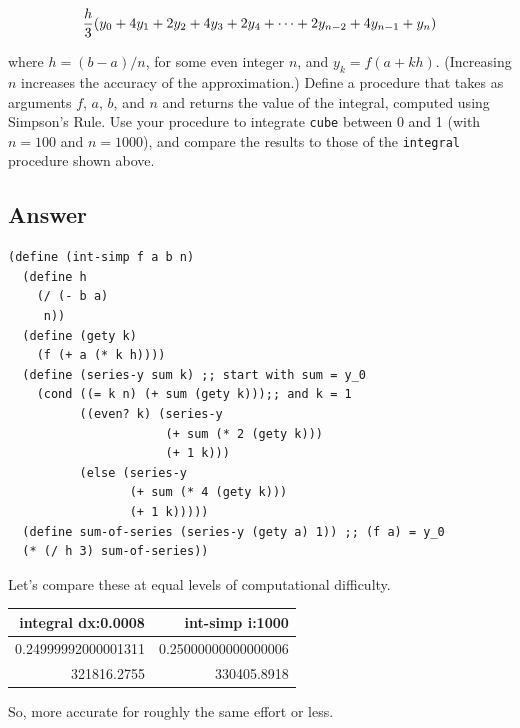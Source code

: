 \documentclass[final,fleqn,titlepage]{article}
\begin{document}
\[
{h\over 3}(y_0 + 4y_1 + 2y_2 + 4y_3 + 2y_4 + \dots + 2y_{n-2} + 4y_{n-1} + y_n)
\]

where \(h = (b - a) / n\), for some even integer \(n\), and \(y_k = f(a + kh)\).
(Increasing \(n\) increases the accuracy of the approximation.) Define a
procedure that takes as arguments \(f\), \(a\), \(b\), and \(n\) and returns the
value of the integral, computed using Simpson's Rule. Use your procedure to
integrate \texttt{cube} between 0 and 1 (with \(n = 100\) and \(n = 1000\)), and
compare the results to those of the \texttt{integral} procedure shown above.
\subsection{Answer}
\label{sec:orgf5c3def}
\begin{verbatim}
(define (int-simp f a b n)
  (define h
    (/ (- b a)
     n))
  (define (gety k)
    (f (+ a (* k h))))
  (define (series-y sum k) ;; start with sum = y_0
    (cond ((= k n) (+ sum (gety k)));; and k = 1
          ((even? k) (series-y
                      (+ sum (* 2 (gety k)))
                      (+ 1 k)))
          (else (series-y
                 (+ sum (* 4 (gety k)))
                 (+ 1 k)))))
  (define sum-of-series (series-y (gety a) 1)) ;; (f a) = y_0
  (* (/ h 3) sum-of-series))
\end{verbatim}

Let's compare these at equal levels of computational difficulty.
\begin{center}
\begin{tabular}{rr}
integral dx:0.0008 & int-simp i:1000\\
\hline
0.24999992000001311 & 0.25000000000000006\\
321816.2755 & 330405.8918\\
\end{tabular}
\end{center}

So, more accurate for roughly the same effort or less.
\end{document}
